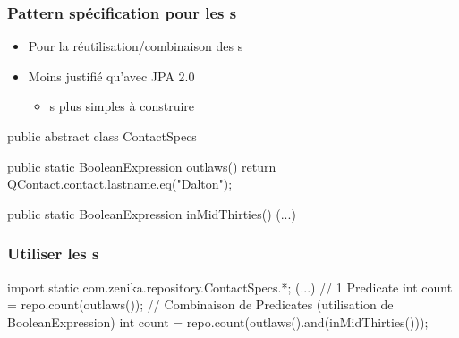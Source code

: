 \begin{frame}[fragile]
 \frametitle{Pattern spécification pour les s}

 \begin{itemize}
  \item Pour la réutilisation/combinaison des s
  \item Moins justifié qu'avec JPA 2.0
  \begin{itemize}
   \item {}s plus simples à construire
  \end{itemize}
 \end{itemize}

\begin{javacode}
public abstract class ContactSpecs {

  public static BooleanExpression outlaws() {
    return QContact.contact.lastname.eq("Dalton");
  }

  public static BooleanExpression inMidThirties() { (...) }

}
\end{javacode}

\end{frame}

\begin{frame}[fragile]
 \frametitle{Utiliser les s}

 \begin{javacode}
import static com.zenika.repository.ContactSpecs.*;
(...)
// 1 Predicate
int count = repo.count(outlaws());
// Combinaison de Predicates (utilisation de BooleanExpression)
int count = repo.count(outlaws().and(inMidThirties()));
 \end{javacode}

\end{frame}